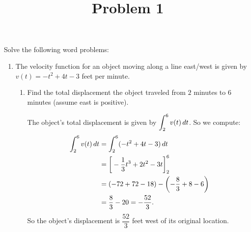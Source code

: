 \documentclass{ximera}
\title[Problem 1]{Problem 1}
\begin{document}
\begin{abstract} \end{abstract}
\maketitle


\begin{problem}

Solve the following word problems:

	\begin{enumerate}

	\item  The velocity function for an object moving along a line east/west is given by
	$v(t) = -t^2 + 4t - 3$ feet per minute.

		\begin{enumerate}

		\item  Find the total displacement the object traveled from $2$ minutes to $6$ minutes (assume east is positive).
		\begin{explanation}
				The object's total displacement is given by $\displaystyle \int_2^6 v(t) \,d t$.  So we compute:
					\begin{align*}
						\displaystyle \int_2^6 v(t) \,d t &= \displaystyle \int_2^6 (-t^2 + 4t - 3) \,d t  \\
							&= \bigg[ - \dfrac{1}{3} t^3 + 2t^2 - 3t \bigg]_2^6  \\
							&= (-72 + 72 - 18) - \left( - \dfrac{8}{3} + 8 - 6 \right)  \\
							&= \dfrac{8}{3} - 20 = - \dfrac{52}{3}.
						\end{align*}
				So the object's displacement is $\dfrac{52}{3}$ feet west of its original location.
			\end{explanation}


\end{enumerate}
\end{enumerate}
\end{problem}
\end{document}
